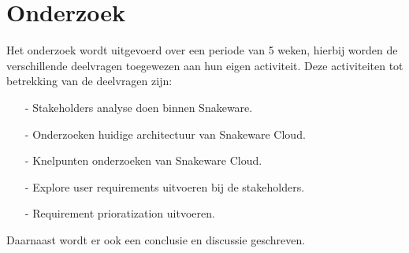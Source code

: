 \section{Onderzoek}
Het onderzoek wordt uitgevoerd over een periode van 5 weken, hierbij worden de verschillende deelvragen toegewezen aan hun eigen activiteit.
Deze activiteiten tot betrekking van de deelvragen zijn: 

\whitespace
\begin{itemize}
	\item[-] Stakeholders analyse doen binnen Snakeware.
	\item[-] Onderzoeken huidige architectuur van Snakeware Cloud.
	\item[-] Knelpunten onderzoeken van Snakeware Cloud.
	\item[-] Explore user requirements uitvoeren bij de stakeholders.
	\item[-] Requirement prioratization uitvoeren.
\end{itemize}

\whitespace
Daarnaast wordt er ook een conclusie en discussie geschreven.

